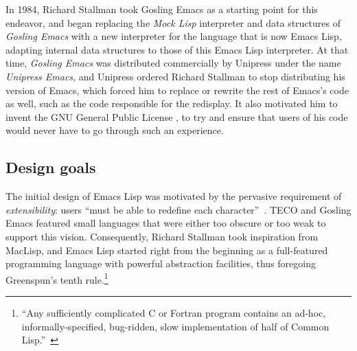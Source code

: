 \documentclass[format=acmsmall, review]{acmart}
\newcommand \Elisp {Emacs Lisp}
\begin{document}
In 1984, Richard Stallman took Gosling Emacs as a starting point for this
endeavor, and began replacing
the \emph{Mock Lisp} interpreter and data structures of \emph{Gosling Emacs}
with a new interpreter for the language that is now \Elisp{}, adapting
internal data structures to those of
this \Elisp{} interpreter.  At that time, \emph{Gosling Emacs} was distributed
commercially by Unipress under the name \emph{Unipress Emacs}, and Unipress
ordered Richard Stallman to stop distributing his version of Emacs, which
forced him to replace or rewrite the rest of Emacs's code as well, such as
the code responsible for the redisplay.  It also motivated him to invent the
GNU General Public License \cite{GPLHistory}, to try and ensure that users
of his code would never have to go through such an experience.

\subsection{Design goals}

The initial design of \Elisp{} was motivated by the pervasive requirement of
\emph{extensibility}: users ``must be able to redefine each
character''~\cite{Stallman1981}.  TECO and Gosling Emacs featured small
languages that were either too obscure or too weak to support this vision.
Consequently, Richard Stallman took inspiration from MacLisp, and \Elisp{}
started right from the beginning as a full-featured programming language with
powerful abstraction facilities, thus foregoing Greenspun's tenth
rule.\footnote{``Any sufficiently complicated C or Fortran program contains an
ad-hoc, informally-specified, bug-ridden, slow implementation of half of
Common Lisp.''~\cite{GreenspunsRule}}
\end{document}
